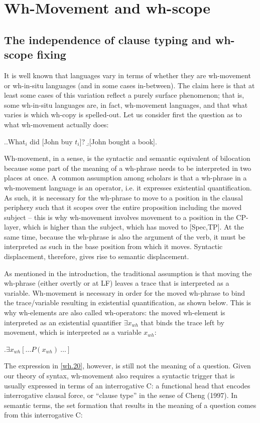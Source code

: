 \documentclass[charis]{glossa}
\begin{document}
\section{Wh-Movement and wh-scope}
\subsection{The independence of clause typing and wh-scope fixing}
It is well known that languages vary in terms of whether they are wh-movement or wh-in-situ languages (and in some cases in-between). The claim here is that at least some cases of this variation reflect a purely surface phenomenon; that is, some wh-in-situ languages are, in fact, wh-movement languages, and that what varies is which wh-copy is spelled-out. Let us consider first the question as to what wh-movement actually does:

\ex.\label{wh.10}\a.\label{2.10a}What$_i$ did [John buy $t_i$]?
	\b.\label{2.10b}[John bought a book].

Wh-movement, in a sense, is the syntactic and semantic equivalent of bilocation because some part of the meaning of a wh-phrase needs to be interpreted in two places at once. A common assumption among scholars is that a wh-phrase in a wh-movement language is an operator, i.e. it expresses existential quantification. As such, it is necessary for the wh-phrase to move to a position in the clausal periphery such that it scopes over the entire proposition including the moved subject -- this is why wh-movement involves movement to a position in the CP-layer, which is higher than the subject, which has moved to [Spec,TP]. At the same time, because the wh-phrase is also the argument of the verb, it must be interpreted as such in the base position from which it moves. Syntactic displacement, therefore, gives rise to semantic displacement.

As mentioned in the introduction, the traditional assumption is that moving the wh-phrase (either overtly or at LF) leaves a trace that is interpreted as a variable. Wh-movement is necessary in order for the moved wh-phrase to bind the trace/variable resulting in existential quantification, as shown below. This is why wh-elements are also called wh-operators: the moved wh-element is interpreted as an existential quantifier $\exists x_{wh}$ that binds the trace left by movement, which is interpreted as a variable $x_{wh}$:

\ex.\label{wh.20}$\exists x_{wh}[\dots P(x_{wh})\ \dots]$

The expression in \ref{wh.20}, however, is still not the meaning of a question. Given our theory of syntax, wh-movement also requires a syntactic trigger that is usually expressed in terms of an interrogative C: a functional head that encodes interrogative clausal force, or ``clause type'' in the sense of Cheng (1997). In semantic terms, the set formation that results in the meaning of a question comes from this interrogative C:
\end{document}
